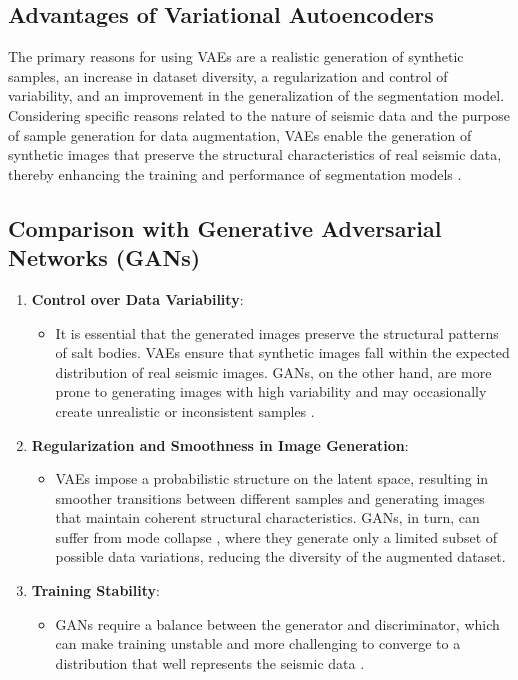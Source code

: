 \documentclass{ieeeaccess}
\providecommand{\DIFaddend}{} %
\DeclareRobustCommand{\DIFaddend}{\DIFOaddend \let\includegraphics\DIFOincludegraphics} %
\begin{document}
\DIFaddend \subsection*{Advantages of Variational Autoencoders}
The primary reasons for using VAEs are a realistic generation of synthetic samples, an increase in dataset diversity, a regularization and control of variability, and an improvement in the generalization of the segmentation model. Considering specific reasons related to the nature of seismic data and the purpose of sample generation for data augmentation, VAEs enable the generation of synthetic images that preserve the structural characteristics of real seismic data, thereby enhancing the training and performance of segmentation models \cite{ref1} \cite{ref15} \cite{ref18}.

\subsection*{Comparison with Generative Adversarial Networks (GANs)}

\begin{enumerate}
    \item \textbf{Control over Data Variability}:
    \begin{itemize}
        \item It is essential that the generated images preserve the structural patterns of salt bodies. VAEs ensure that synthetic images fall within the expected distribution of real seismic images. GANs, on the other hand, are more prone to generating images with high variability and may occasionally create unrealistic or inconsistent samples \cite{ref16}.
    \end{itemize}
    \item \textbf{Regularization and Smoothness in Image Generation}:
    \begin{itemize}
        \item VAEs impose a probabilistic structure on the latent space, resulting in smoother transitions between different samples and generating images that maintain coherent structural characteristics. GANs, in turn, can suffer from mode collapse \cite{ref16}, where they generate only a limited subset of possible data variations, reducing the diversity of the augmented dataset.
    \end{itemize}
    \item \textbf{Training Stability}:
    \begin{itemize}
        \item GANs require a balance between the generator and discriminator, which can make training unstable and more challenging to converge to a distribution that well represents the seismic data \cite{ref16}.
    \end{itemize}
\end{enumerate}
\end{document}
